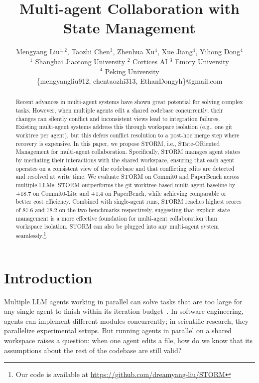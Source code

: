 \documentclass{article}
\title{Multi-agent Collaboration with State Management}
\author{Mengyang Liu$^{1,2}$, Taozhi Chen$^{3}$, Zhenhua Xu$^{4}$, Xue Jiang$^{4}$, Yihong Dong$^{4}$\\
$^1$ Shanghai Jiaotong University \quad $^2$ Cortices AI\nocite{CorticesAI} \quad $^3$ Emory University \\
$^4$ Peking University\\
\{mengyangliu912, chentaozhi313, EthanDongyh\}@gmail.com
}
\begin{document}
\maketitle


\begin{abstract}

Recent advances in multi-agent systems have shown great potential for solving complex tasks. However, when multiple agents edit a shared codebase concurrently, their changes can silently conflict and inconsistent views lead to integration failures. Existing multi-agent systems address this through workspace isolation (e.g., one git worktree per agent), but this defers conflict resolution to a post-hoc merge step where recovery is expensive. In this paper, we propose STORM, i.e., STate-ORiented Management for multi-agent collaboration. Specifically, STORM manages agent states by mediating their interactions with the shared workspace, ensuring that each agent operates on a consistent view of the codebase and that conflicting edits are detected and resolved at write time. We evaluate STORM on Commit0 and PaperBench across multiple LLMs. STORM outperforms the git-worktree-based multi-agent baseline by +18.7 on Commit0-Lite and +1.4 on PaperBench, while achieving comparable or better cost efficiency. Combined with single-agent runs, STORM reaches highest scores of 87.6 and 78.2 on the two benchmarks respectively, suggesting that explicit state management is a more effective foundation for multi-agent collaboration than workspace isolation. STORM can also be plugged into any multi-agent system seamlessly.\footnote{Our code is available at \url{https://github.com/dreamyang-liu/STORM}}.

\end{abstract}


\section{Introduction}
\label{sec:intro}

Multiple LLM agents working in parallel can solve tasks that are too large for any single agent to finish within its iteration budget~\citep{selfcollaboration, chatdev,metagpt,caid,coral}. In software engineering, agents can implement different modules concurrently; in scientific research, they parallelize experimental setups. But running agents in parallel on a shared workspace raises a question: when one agent edits a file, how do we know that its assumptions about the rest of the codebase are still valid?
\end{document}
